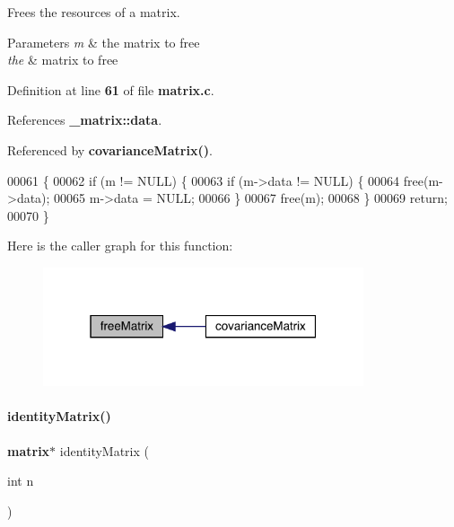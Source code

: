 Frees the resources of a matrix. 


\begin{DoxyParams}{Parameters}
{\em m} & the matrix to free\\
\hline
{\em the} & matrix to free \\
\hline
\end{DoxyParams}


Definition at line \textbf{ 61} of file \textbf{ matrix.\+c}.



References \textbf{ \+\_\+matrix\+::data}.



Referenced by \textbf{ covariance\+Matrix()}.


\begin{DoxyCode}
00061                            \{
00062   \textcolor{keywordflow}{if} (m != NULL) \{
00063     \textcolor{keywordflow}{if} (m->data != NULL) \{
00064       free(m->data);
00065       m->data = NULL;
00066     \}
00067     free(m);
00068   \}
00069   \textcolor{keywordflow}{return};
00070 \}
\end{DoxyCode}
Here is the caller graph for this function\+:
\nopagebreak
\begin{figure}[H]
\begin{center}
\leavevmode
\includegraphics[width=268pt]{matrix_8h_ae98365c910e9d688d2bdedec50d89a6b_icgraph}
\end{center}
\end{figure}
\mbox{\label{matrix_8h_aa3f5e409b1641373be7cf7284e216d1a}} 
\paragraph{identity\+Matrix()}
{\footnotesize\ttfamily \textbf{ matrix}$\ast$ identity\+Matrix (\begin{DoxyParamCaption}\item[{int}]{n }\end{DoxyParamCaption})}



